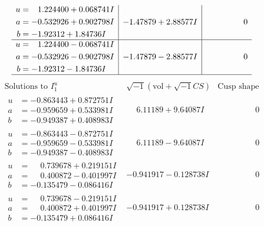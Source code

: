 \documentclass[1p]{elsarticle_modified}
\theoremstyle{definition}
\newcommand{\I}{\sqrt{-1}}
\begin{document}
$$\begin{array}{c|c|c}
\begin{aligned}
u &= \phantom{-}1.224400 + 0.068741 I \\
a &= -0.532926 + 0.902798 I \\
b &= -1.92312 + 1.84736 I\end{aligned}
 & -1.47879 + 2.88577 I & \phantom{-0.000000 } 0 \\ \hline\begin{aligned}
u &= \phantom{-}1.224400 - 0.068741 I \\
a &= -0.532926 - 0.902798 I \\
b &= -1.92312 - 1.84736 I\end{aligned}
 & -1.47879 - 2.88577 I & \phantom{-0.000000 } 0\\
 \hline 
 \end{array}$$\newpage$$\begin{array}{c|c|c}  
\text{Solutions to }I^u_{1}& \I (\text{vol} + \sqrt{-1}CS) & \text{Cusp shape}\\
 \hline 
\begin{aligned}
u &= -0.863443 + 0.872751 I \\
a &= -0.959659 + 0.533981 I \\
b &= -0.949387 + 0.408983 I\end{aligned}
 & \phantom{-}6.11189 + 9.64087 I & \phantom{-0.000000 } 0 \\ \hline\begin{aligned}
u &= -0.863443 - 0.872751 I \\
a &= -0.959659 - 0.533981 I \\
b &= -0.949387 - 0.408983 I\end{aligned}
 & \phantom{-}6.11189 - 9.64087 I & \phantom{-0.000000 } 0 \\ \hline\begin{aligned}
u &= \phantom{-}0.739678 + 0.219151 I \\
a &= \phantom{-}0.400872 - 0.401997 I \\
b &= -0.135479 - 0.086416 I\end{aligned}
 & -0.941917 - 0.128738 I & \phantom{-0.000000 } 0 \\ \hline\begin{aligned}
u &= \phantom{-}0.739678 - 0.219151 I \\
a &= \phantom{-}0.400872 + 0.401997 I \\
b &= -0.135479 + 0.086416 I\end{aligned}
 & -0.941917 + 0.128738 I & \phantom{-0.000000 } 0 \\ \hline\begin{aligned}

\end{aligned}
\end{array}$$
\end{document}
